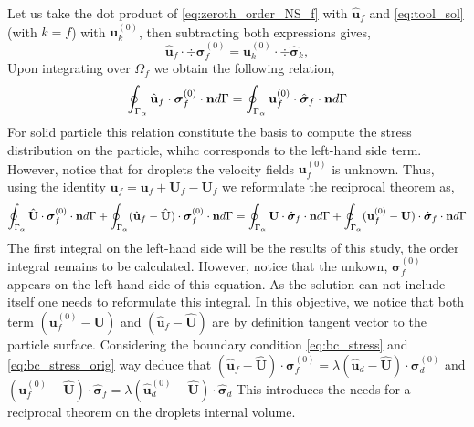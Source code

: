 Let us take the dot product of \ref{eq:zeroth_order_NS_f} with $\hat{\textbf{u}}_f$ and \ref{eq:tool_sol} (with $k = f$) with $\textbf{u}_k^{(0)}$, then subtracting both expressions gives, 
\begin{equation*}
    \hat{\textbf{u}}_f\cdot \div\bm\sigma_f^{(0)}
    =
    \textbf{u}_k^{(0)} \cdot \div \hat{\bm\sigma}_k, 
\end{equation*}
Upon integrating over $\Omega_f$ we obtain the following relation, 
\begin{equation*}
    \oint_{\Gamma_{\alpha}} \hat{\textbf{u}}_f\cdot  \bm\sigma_f^{(0)} \cdot \textbf{n} d\Gamma
    = 
    \oint_{\Gamma_{\alpha}} \textbf{u}_f^{(0)}\cdot  \hat{\bm\sigma}_f \cdot \textbf{n} d\Gamma
\end{equation*}
For solid particle this relation constitute the basis to compute the stress distribution on the particle, whihc corresponds to the left-hand side term. 
However, notice that for droplets the velocity fields $\textbf{u}_f^{(0)}$ is unknown.
Thus, using the identity $\textbf{u}_f = \textbf{u}_f +\textbf{U}_f-\textbf{U}_f$ we reformulate the reciprocal theorem as, 
\begin{equation}
    \oint_{\Gamma_{\alpha}} \hat{\textbf{U}}\cdot  \bm\sigma_f^{(0)} \cdot \textbf{n} d\Gamma
    + \oint_{\Gamma_{\alpha}} (\hat{\textbf{u}}_f - \hat{\textbf{U}})\cdot  \bm\sigma_f^{(0)} \cdot \textbf{n} d\Gamma
    = 
    \oint_{\Gamma_{\alpha}} \textbf{U}\cdot  \hat{\bm\sigma}_f \cdot \textbf{n} d\Gamma
    + \oint_{\Gamma_{\alpha}} (\textbf{u}_f^{(0)} - \textbf{U})\cdot  \hat{\bm\sigma}_f \cdot \textbf{n} d\Gamma
    \label{eq:reciprocal_f}
\end{equation}
The first integral on the left-hand side will be the results of this study, the order integral remains to be calculated. 
However, notice that the unkown, $\bm\sigma_f^{(0)}$ appears on the  left-hand side of this equation. 
As the solution can not include itself one needs to reformulate this integral. 
In this objective, we notice that both term $(\textbf{u}_f^{(0)} - \textbf{U})$ and $(\hat{\textbf{u}}_f - \hat{\textbf{U}})$ are by definition tangent vector to the particle surface. 
Considering the boundary condition \ref{eq:bc_stress} and \ref{eq:bc_stress_orig} way deduce that $(\hat{\textbf{u}}_f - \hat{\textbf{U}})\cdot  \bm\sigma_f^{(0)} = \lambda (\hat{\textbf{u}}_d - \hat{\textbf{U}})\cdot  \bm\sigma_d^{(0)}$ and  $({\textbf{u}}_f^{(0)} - \hat{\textbf{U}})\cdot  \hat{\bm\sigma}_f = \lambda (\hat{\textbf{u}}_d^{(0)} - \hat{\textbf{U}})\cdot  \hat{\bm\sigma}_d$
This introduces the needs for a reciprocal theorem on the droplets internal volume. 

